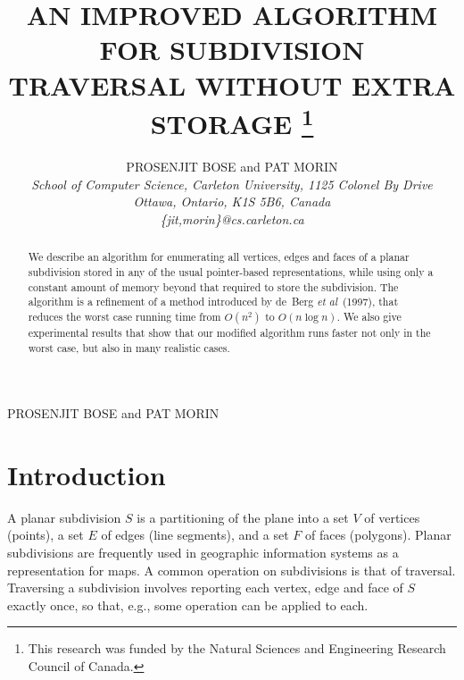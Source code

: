 \documentclass{article}
\title{\MakeUppercase{An Improved Algorithm for Subdivision Traversal 
	without Extra Storage}%
	\thanks{This research was funded by the Natural Sciences and 
	Engineering Research Council of Canada.}}
\author{\MakeUppercase{Prosenjit Bose} and \MakeUppercase{Pat Morin}\\[2pt]
	\textit{School of Computer Science, 
		Carleton University, 1125 Colonel By Drive \\ 
	Ottawa, Ontario, K1S 5B6, Canada \\
	\{jit,morin\}@cs.carleton.ca}}
\date{}{}
\newcommand{\etal}{\emph{et al}}
\begin{document}
\copyrightheading

\renewcommand{\thefootnote}{\fnsymbol{footnote}}


\textlineskip

\begin{center}

\vspace{24pt}

{\authorfont \MakeUppercase{Prosenjit Bose} and 
	\MakeUppercase{Pat Morin}}

\vspace{2pt}


\vspace{20pt}

\end{center}

\alphfootnote

\begin{abstract}
We describe an algorithm for enumerating all vertices, edges and faces
of a planar subdivision stored in any of the usual pointer-based
representations, while using only a constant amount of memory beyond
that required to store the subdivision.  The algorithm is a refinement
of a method introduced by \mbox{de Berg} \etal\ (1997), that reduces
the worst case running time from $O(n^2)$ to $O(n\log n)$. We also
give experimental results that show that our modified algorithm runs
faster not only in the worst case, but also in many realistic cases.
\end{abstract}

\textlineskip
\section{Introduction}

A planar subdivision $S$ is a partitioning of the plane into a set $V$
of vertices (points), a set $E$ of edges (line segments), and a set
$F$ of faces (polygons).  Planar subdivisions are frequently used in
geographic information systems as a representation for maps.  A common
operation on subdivisions is that of traversal.  Traversing a
subdivision involves reporting each vertex, edge and face of $S$
exactly once, so that, e.g., some operation can be applied to each.
\end{document}
